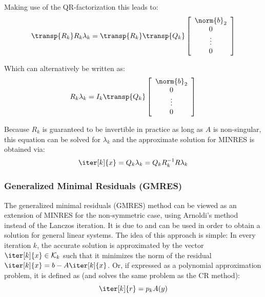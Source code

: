 \noindent Making use of the QR-factorization this leads to:
\begin{equation}
    \transp{R_k}R_k\lambda_k=\transp{R_k}\transp{Q_{k}}\left[
        \begin{array}{c}
      \norm{b}_2 \\
       0 \\
      \vdots \\
      0 \\
    \end{array}\right]
\end{equation}

\noindent Which can alternatively be written as:
\begin{equation}
    R_k\lambda_k=I_k\transp{Q_{k}}\left[
        \begin{array}{c}
      \norm{b}_2 \\
       0 \\
      \vdots \\
      0 \\
    \end{array}\right]
\end{equation}

\noindent Because $R_k$ is guaranteed to be invertible in practice as long as $A$ is non-singular, this equation can be solved for $\lambda_k$ and the approximate solution for MINRES is obtained via:
\begin{equation}
    \iter[k]{x} = Q_k\lambda_k=Q_kR_k^{-1}R\lambda_k
\end{equation}



\subsubsection{Generalized Minimal Residuals (GMRES)}
\label{sec:gmres}

The generalized minimal residuals (GMRES) method can be viewed as an extension of MINRES for the non-symmetric case, using Arnoldi's method instead of the Lanczos iteration. It is due to \cite{saad_gmres_1986} and can be used in order to obtain a solution for general linear systems. The idea of this approach is simple: In every iteration $k$, the accurate solution is approximated by the vector $\iter[k]{x} \in \mathcal{K}_k$ such that it minimizes the norm of the residual $\iter[k]{x}=b-A\iter[k]{x}$. Or, if expressed as a polynomial approximation problem, it is defined as (and solves the same problem as the CR method):
\begin{equation}
    \iter[k]{r}=p_kA(y)
\end{equation}


